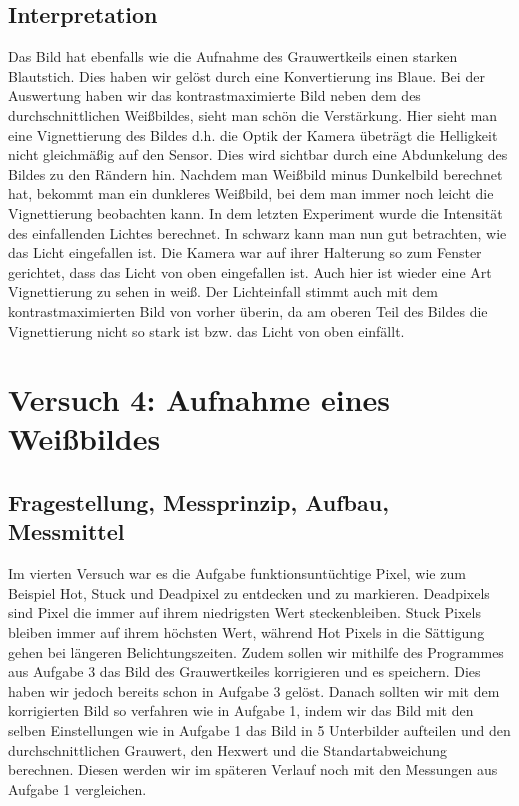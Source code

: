 \documentclass[12pt, oneside, a4paper, \docLanguage]{report}
\begin{document}
\section{Interpretation}
\label{chap:VERSUCH_3_INTERPRETATION}
Das Bild hat ebenfalls wie die Aufnahme des Grauwertkeils einen starken Blautstich.
Dies haben wir gelöst durch eine Konvertierung ins Blaue. 
\newline
Bei der Auswertung haben wir das kontrastmaximierte Bild neben dem des durchschnittlichen Weißbildes, 
sieht man schön die Verstärkung.
Hier sieht man eine Vignettierung des Bildes d.h. die Optik der Kamera
übeträgt die Helligkeit nicht gleichmäßig auf den Sensor.
\newline
\newline
Dies wird sichtbar durch eine Abdunkelung des Bildes zu den Rändern hin.
Nachdem man Weißbild minus Dunkelbild berechnet hat, bekommt man ein dunkleres Weißbild, bei dem man immer noch leicht die Vignettierung beobachten kann.
\newline
\newline
In dem letzten Experiment wurde die Intensität des einfallenden Lichtes berechnet.
In schwarz kann man nun gut betrachten, wie das Licht eingefallen ist.
\newline
Die Kamera war auf ihrer Halterung so zum Fenster gerichtet, dass das Licht von oben eingefallen ist.
\newline
Auch hier ist wieder eine Art Vignettierung zu sehen in weiß.
Der Lichteinfall stimmt auch mit dem kontrastmaximierten Bild von vorher überin, da am oberen Teil des Bildes die Vignettierung nicht so stark ist bzw. das Licht von oben einfällt.


%
%
\chapter{Versuch 4: Aufnahme eines Weißbildes}
\label{chap:VERSUCH_4}

\section{Fragestellung, Messprinzip, Aufbau, Messmittel}
\label{chap:VERSUCH_4_FRAGESTELLUNG}
Im vierten Versuch war es die Aufgabe funktionsuntüchtige Pixel, wie zum Beispiel Hot, Stuck und Deadpixel zu entdecken und zu markieren.
Deadpixels sind Pixel die immer auf ihrem niedrigsten Wert steckenbleiben.
\newline 
Stuck Pixels bleiben immer auf ihrem höchsten Wert, während Hot Pixels in die Sättigung gehen bei längeren Belichtungszeiten.
Zudem sollen wir mithilfe des Programmes aus Aufgabe 3 das Bild des Grauwertkeiles korrigieren und es speichern.
\newline
\newline
Dies haben wir jedoch bereits schon in Aufgabe 3 gelöst. 
Danach sollten wir mit dem korrigierten Bild so verfahren wie in Aufgabe 1, indem wir das Bild mit den selben Einstellungen wie in Aufgabe 1 das Bild in 5 Unterbilder aufteilen und den durchschnittlichen Grauwert, den Hexwert und die Standartabweichung berechnen.
\newline
Diesen werden wir im späteren Verlauf noch mit den Messungen aus Aufgabe 1 vergleichen.
\end{document}
